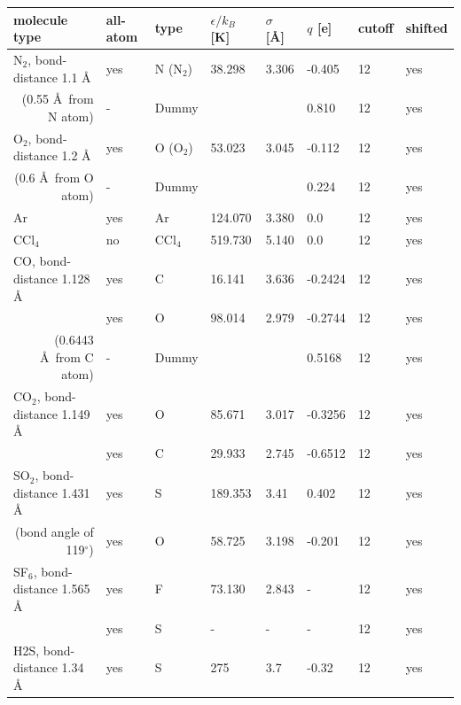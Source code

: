 \begin{table}[H]
\begin{tabular}{p{5.5cm}|p{1.5cm}|p{1.3cm}|p{1.3cm}|p{1.0cm}|p{1.15cm}|p{1.0cm}|p{1.0cm}}
molecule type &  all-atom & type & $\epsilon/k_B$ [K] & $\sigma$ [\AA] & $q$ [e] & cutoff & shifted\\
\hline
\hline
N$_2$, bond-distance 1.1 \AA \cite{MartinCalvo2011} & yes  & N (N$_2$) & 38.298 & 3.306 & -0.405 & 12 & yes\\
\multicolumn{1}{r|}{(0.55 \AA\ from N atom)}   & -    & Dummy     &        &       & 0.810  & 12 & yes\\
\hline
O$_2$, bond-distance 1.2 \AA \cite{MartinCalvo2011} & yes  & O (O$_2$) & 53.023 & 3.045 & -0.112 & 12 & yes\\
\multicolumn{1}{r|}{(0.6 \AA\ from O atom)}  & -    & Dummy     &        &       & 0.224  & 12 & yes\\
\hline
Ar \cite{MartinCalvo2011} & yes  & Ar & 124.070 & 3.380 & 0.0 & 12 & yes\\
\hline
CCl$_4$  \cite{MartinCalvo2011} & no  & CCl$_4$ & 519.730 & 5.140 & 0.0 & 12 & yes\\
\hline
CO, bond-distance 1.128 \AA  \cite{MartinCalvo2012}  & yes  & C     & 16.141 & 3.636 & -0.2424 & 12 & yes\\
                            & yes  & O     & 98.014 & 2.979 & -0.2744 & 12 & yes\\
\multicolumn{1}{r|}{(0.6443 \AA\ from C atom)}   & -    & Dummy &        &       &  0.5168 & 12 & yes\\
\hline
CO$_2$, bond-distance 1.149 \AA\ \cite{GarciaSanchez2009} & yes  & O     & 85.671 & 3.017 & -0.3256 & 12 & yes\\
                              & yes  & C     & 29.933 & 2.745 & -0.6512 & 12 & yes\\
\hline
SO$_2$, bond-distance 1.431 \AA\ \cite{MatitoMartos2014}  & yes  & S     & 189.353 & 3.41 & 0.402 & 12 & yes\\
\multicolumn{1}{r|}{(bond angle of 119$^\circ$)} & yes  & O     & 58.725 & 3.198 & -0.201 & 12 & yes\\
\hline
SF$_6$, bond-distance 1.565 \AA\ \cite{MatitoMartos2015} & yes  & F     & 73.130 & 2.843 & - & 12 & yes\\
                                & yes  & S     &  - &   - & - & 12 & yes\\
\hline
H2S, bond-distance 1.34 \AA\ \cite{GutierrezSevillano2013} & yes  & S     & 275 & 3.7 & -0.32 & 12 & yes\\

\end{tabular}
\end{table}

